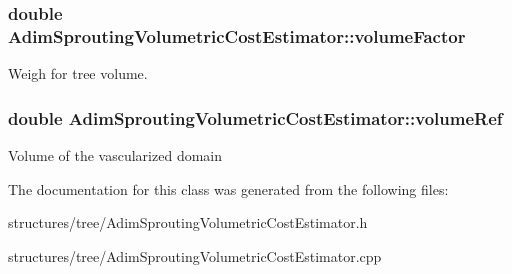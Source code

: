 \subsubsection[{\texorpdfstring{volume\+Factor}{volumeFactor}}]{\setlength{\rightskip}{0pt plus 5cm}double Adim\+Sprouting\+Volumetric\+Cost\+Estimator\+::volume\+Factor\hspace{0.3cm}{\ttfamily [private]}}\hypertarget{class_adim_sprouting_volumetric_cost_estimator_a1d1ad71ae3bf8c56867108d30eba8091}{}\label{class_adim_sprouting_volumetric_cost_estimator_a1d1ad71ae3bf8c56867108d30eba8091}
Weigh for tree volume. 
\subsubsection[{\texorpdfstring{volume\+Ref}{volumeRef}}]{\setlength{\rightskip}{0pt plus 5cm}double Adim\+Sprouting\+Volumetric\+Cost\+Estimator\+::volume\+Ref\hspace{0.3cm}{\ttfamily [private]}}\hypertarget{class_adim_sprouting_volumetric_cost_estimator_ac04ce5ad212cc71e3de3c3d3563217a2}{}\label{class_adim_sprouting_volumetric_cost_estimator_ac04ce5ad212cc71e3de3c3d3563217a2}
Volume of the vascularized domain 

The documentation for this class was generated from the following files\+:\begin{DoxyCompactItemize}
\item 
structures/tree/Adim\+Sprouting\+Volumetric\+Cost\+Estimator.\+h\item 
structures/tree/Adim\+Sprouting\+Volumetric\+Cost\+Estimator.\+cpp\end{DoxyCompactItemize}
